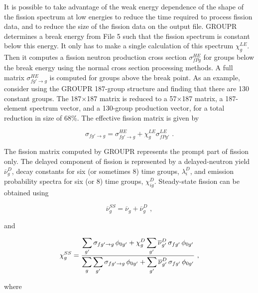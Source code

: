 It is possible to take advantage of the weak energy dependence of the
shape of the fission spectrum at low energies to reduce the time required
to process fission data, and to reduce the size of the fission data on the
output file.  GROUPR determines a break energy from File 5 such that
the fission spectrum is constant below this energy.  It only has to make
a single calculation of this spectrum $\chi^{LE}_g$.  Then it computes
a fission neutron production cross section $\sigma^{HE}_{fPg}$ for
groups below the break energy using the normal cross section processing
methods.  A full matrix $\sigma^{HE}_{fg'{\rightarrow}g}$ is computed
for groups above the break point.  As an example, consider using the
GROUPR 187-group structure and finding that there are 130 constant groups.
The 187${\times}$187 matrix is reduced to a 57${\times}$187 matrix,
a 187-element spectrum vector, and a 130-group production vector, for
a total reduction in size of 68\%.  The effective fission matrix is
given by

\begin{equation}
   \sigma_{fg'{\rightarrow}g}=\sigma^{HE}_{fg'{\rightarrow}g}
      + \chi^{LE}_g\sigma^{LE}_{fPg'} \,\,.
\end{equation}
\vspace{0.5 pt}

The fission matrix computed by GROUPR represents the prompt part
of fission only.  The delayed component of
fission is represented by a delayed-neutron
yield $\overline\nu_{g}^D$, decay constants for six (or sometimes 8)
time groups, $\lambda_i^D$, and emission probability spectra for
six (or 8) time groups, $\chi_{ig}^D$.  Steady-state fission
 can be obtained using

  \begin{equation}
    \overline\nu_g^{SS}=\overline\nu_g
    +\overline\nu_g^D\,\,,
  \end{equation}

\noindent
and

  \begin{equation}
    \chi_g^{SS}={\displaystyle{\sum_{g'}\sigma_{fg'\rightarrow g}\,\phi_{0g'}
    +\chi_g^D\sum_{g'}\overline\nu_{g'}^D\,\sigma_{fg'}\,\phi_{0g'}}
    \over\displaystyle{\sum_g\sum_{g'}\sigma_{fg'\rightarrow g}\,\phi_{0g'}
    +\sum_{g'}\overline\nu_{g'}^D\,\sigma_{fg'}\,\phi_{0g'}}}\,\,,
  \end{equation}

\noindent
where

